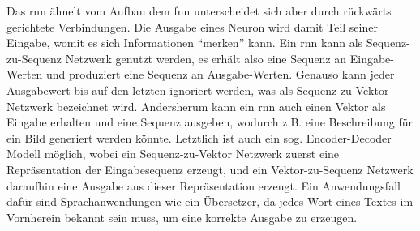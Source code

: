Das \gls{rnn} ähnelt vom Aufbau dem \gls{fnn} unterscheidet sich aber durch rückwärts gerichtete Verbindungen. Die Ausgabe eines Neuron wird damit Teil seiner Eingabe, womit es sich Informationen "`merken"' kann. Ein \gls{rnn} kann als Sequenz-zu-Sequenz Netzwerk genutzt werden, es erhält also eine Sequenz an Eingabe-Werten und produziert eine Sequenz an Ausgabe-Werten. Genauso kann jeder Ausgabewert bis auf den letzten ignoriert werden, was als Sequenz-zu-Vektor Netzwerk bezeichnet wird. Andersherum kann ein \gls{rnn} auch einen Vektor als Eingabe erhalten und eine Sequenz ausgeben, wodurch z.B. eine Beschreibung für ein Bild generiert werden könnte. Letztlich ist auch ein sog. Encoder-Decoder Modell möglich, wobei ein Sequenz-zu-Vektor Netzwerk zuerst eine Repräsentation der Eingabesequenz erzeugt, und ein Vektor-zu-Sequenz Netzwerk daraufhin eine Ausgabe aus dieser Repräsentation erzeugt. Ein Anwendungsfall dafür sind Sprachanwendungen wie ein Übersetzer, da jedes Wort eines Textes im Vornherein bekannt sein muss, um eine korrekte Ausgabe zu erzeugen. \cite[vgl. S. 497 ff.]{Geron2019}
